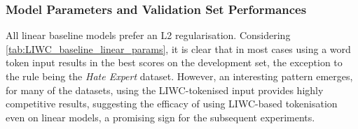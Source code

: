 \subsubsection{Model Parameters and Validation Set Performances}
All linear baseline models prefer an L2 regularisation.
Considering \cref{tab:LIWC_baseline_linear_params}, it is clear that in most cases using a word token input results in the best scores on the development set, the exception to the rule being the \textit{Hate Expert} dataset.
However, an interesting pattern emerges, for many of the datasets, using the LIWC-tokenised input provides highly competitive results, suggesting the efficacy of using LIWC-based tokenisation even on linear models, a promising sign for the subsequent experiments.

\begin{table}[]
\centering
{}
\end{table}
